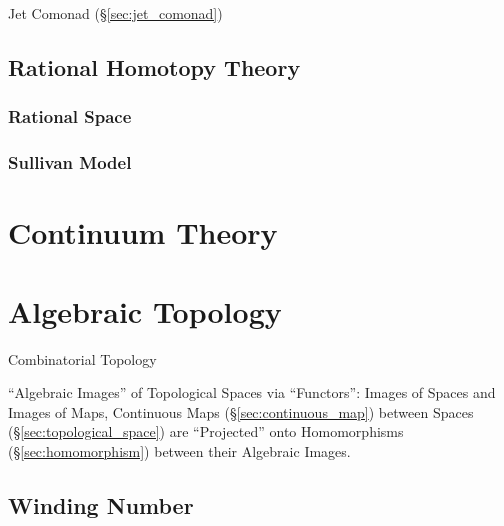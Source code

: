 \fist Jet Comonad (\S\ref{sec:jet_comonad})



\subsection{Rational Homotopy Theory}\label{sec:rational_homotopy}

\subsubsection{Rational Space}\label{sec:rational_space}

\subsubsection{Sullivan Model}\label{sec:sullivan_model}



\section{Continuum Theory}\label{sec:continuum_theory}

\section{Algebraic Topology}\label{sec:algebraic_topology}

Combinatorial Topology

``Algebraic Images'' of Topological Spaces via ``Functors'': Images of
Spaces and Images of Maps, Continuous Maps
(\S\ref{sec:continuous_map}) between Spaces
(\S\ref{sec:topological_space}) are ``Projected'' onto Homomorphisms
(\S\ref{sec:homomorphism}) between their Algebraic
Images.\cite{hatcher02}



\subsection{Winding Number}\label{sec:winding_number}

